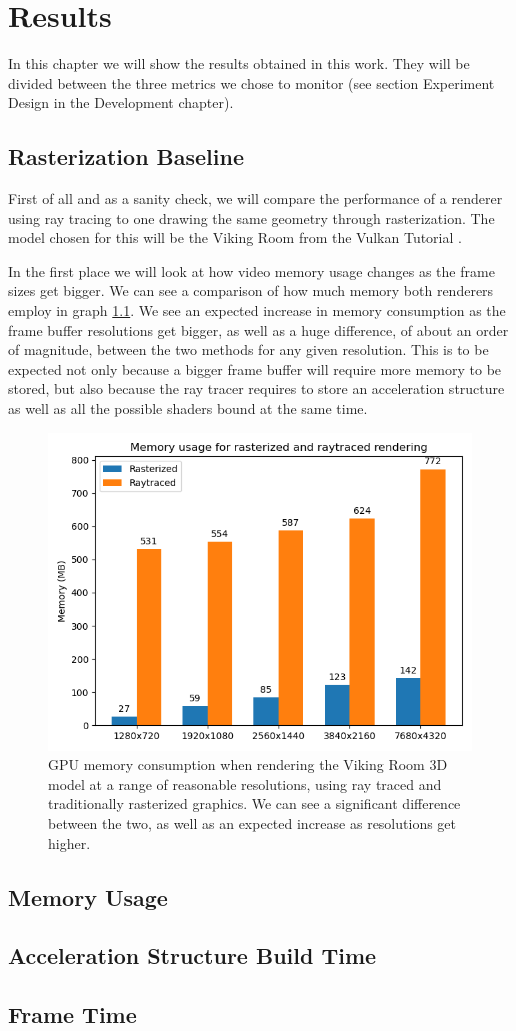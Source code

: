 \chapter{Results}

In this chapter we will show the results obtained in this work. They will be divided between the three metrics we chose to monitor (see section Experiment Design in the Development chapter).

\section{Rasterization Baseline}
First of all and as a sanity check, we will compare the performance of a renderer using ray tracing to one drawing the same geometry through rasterization. The model chosen for this will be the Viking Room from the Vulkan Tutorial \cite{VulkanTutorial}.

In the first place we will look at how video memory usage changes as the frame sizes get bigger. We can see a comparison of how much memory both renderers employ in graph \ref{memory-usage-comparison-graph}. We see an expected increase in memory consumption as the frame buffer resolutions get bigger, as well as a huge difference, of about an order of magnitude, between the two methods for any given resolution. This is to be expected not only because a bigger frame buffer will require more memory to be stored, but also because the ray tracer requires to store an acceleration structure as well as all the possible shaders bound at the same time.


\begin{figure}[hbt!]
    \centering
    \includegraphics[width=1.0\textwidth]{figuras/vulkan-memory-usage-comparison.png}
    \caption{GPU memory consumption when rendering the Viking Room 3D model at a range of reasonable resolutions, using ray traced and traditionally rasterized graphics. We can see a significant difference between the two, as well as an expected increase as resolutions get higher.}
    \label{memory-usage-comparison-graph}
\end{figure}
\section{Memory Usage}
\section{Acceleration Structure Build Time}
\section{Frame Time}
